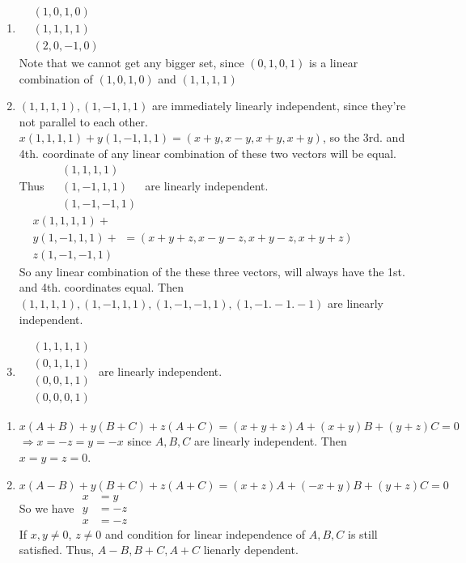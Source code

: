 \documentclass[twoside]{amsart}
\theoremstyle{plain}
\theoremstyle{definition}
\newcommand{\exercisehead}[1]
  {\smallskip
   \noindent{\small\bf Exercise #1.}}
\begin{document}
\exercisehead{14} 
\begin{enumerate}
\item $\begin{aligned}
  & (1,0,1,0) \\
  & (1,1,1,1) \\
  & (2,0,-1,0)
\end{aligned}$ \quad \quad \\
  Note that we cannot get any bigger set, since $(0,1,0,1)$ is a linear combination of $(1,0,1,0)$ and $(1,1,1,1)$ \\
\item $(1,1,1,1), (1,-1,1,1)$ are immediately linearly independent, since they're not parallel to each other.  \\

$x(1,1,1,1) + y(1,-1,1,1) = (x+y,x-y,x+y,x+y)$, so the 3rd. and 4th. coordinate of any linear combination of these two vectors will be equal.  \medskip \\
  Thus $\begin{aligned}
    & (1,1,1,1) \\
    & (1,-1,1,1) \\
    & (1,-1,-1,1)
\end{aligned}$ are linearly independent.   \\

$\begin{aligned}
    & x(1,1,1,1) + \\
    & y(1,-1,1,1) + \\
    & z(1,-1,-1,1)
\end{aligned} = (x+y+z,x-y-z,x+y-z, x+y+z)$ \medskip \\
So any linear combination of the these three vectors, will always have the 1st. and 4th. coordinates equal.  Then \smallskip \\
$(1,1,1,1), (1,-1,1,1), (1,-1,-1,1),(1,-1.-1.-1)$ are linearly independent.  
\item $\begin{aligned}
  & (1,1,1,1) \\
  & (0,1,1,1) \\
  & (0,0,1,1) \\
  & (0,0,0,1)
\end{aligned}$ are linearly independent.  
\end{enumerate}

\exercisehead{15} 
\begin{enumerate}
\item $x(A+B) + y(B+C) + z(A+C) = (x+y+z)A + (x+y)B + (y+z)C = 0 $ \\
  $\Longrightarrow x = -z = y = -x $ since $A,B,C$ are linearly independent.  Then $x=y=z =0$.  
\item $x(A-B) + y(B+C) + z(A+C) = (x+z)A + (-x +y)B + (y+z)C =0$  So we have $\begin{aligned}
  x & = y \\
  y & = -z \\
  x & = -z 
\end{aligned}$ \medskip \\
  If $x,y\neq 0$, $z \neq 0$ and condition for linear independence of $A,B,C$ is still satisfied.  Thus, $A-B, B+C, A+C$ lienarly dependent.  
\end{enumerate}
\end{document}
